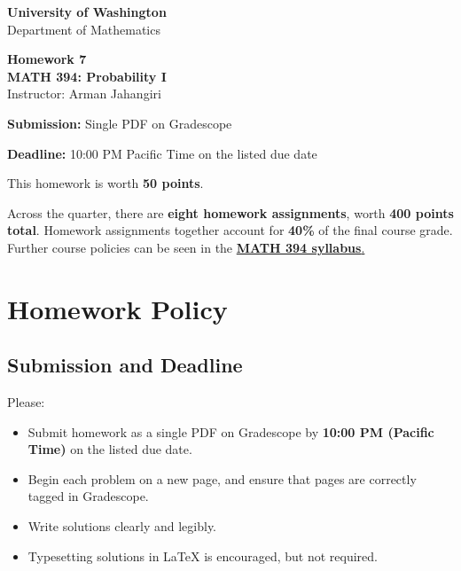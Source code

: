 \documentclass[11pt]{article}
\newcommand{\course}{MATH 394: Probability I}
\newcommand{\department}{Department of Mathematics}
\newcommand{\university}{University of Washington}
\begin{document}
\begin{titlepage}
\centering
\vspace*{1.2cm}

{\Large \textbf{\university}}\\
{\large \department}

\vspace{1.5cm}

{\Huge \color{uwpurple}\textbf{Homework 7}}\\[0.25cm]
{\Large \textbf{\course}}\\[0.25cm]
{\large Instructor: Arman Jahangiri}

\vspace{1cm}

\begin{tcolorbox}[width=0.78\textwidth,colback=softpurple,colframe=uwpurple,boxrule=0.9pt,arc=3mm]
\centering
\textbf{Submission:} Single PDF on Gradescope

\textbf{Deadline:} 10:00 PM Pacific Time on the listed due date
\end{tcolorbox}

\vspace{0.8cm}

\begin{tcolorbox}[width=0.86\textwidth,colback=white,colframe=uwgold,boxrule=0.8pt,arc=3mm]
This homework is worth \textbf{50 points}.

Across the quarter, there are \textbf{eight homework assignments}, worth \textbf{400 points total}. Homework assignments together account for \textbf{40\%} of the final course grade. Further course policies can be seen in the \href{https://armanjg.github.io/MATH-394-Probability-1-v2/}{\textbf{MATH 394 syllabus}.}
\end{tcolorbox}

\vfill
\end{titlepage}

\section*{Homework Policy}

\subsection*{Submission and Deadline}

Please:

\begin{itemize}[leftmargin=*]
    \item Submit homework as a single PDF on Gradescope by \textbf{10:00 PM (Pacific Time)} on the listed due date.
    \item Begin each problem on a new page, and ensure that pages are correctly tagged in Gradescope.
    \item Write solutions clearly and legibly.
    \item Typesetting solutions in LaTeX is encouraged, but not required.
\end{itemize}
\end{document}

